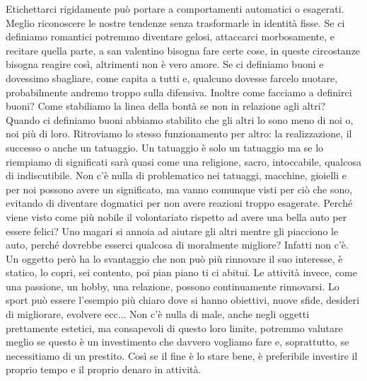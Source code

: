\documentclass[12pt]{book} %
\begin{document}
Etichettarci rigidamente può portare a comportamenti automatici o esagerati. Meglio riconoscere le nostre tendenze senza trasformarle in identità fisse.
Se ci definiamo romantici potremmo diventare gelosi, attaccarci morbosamente, e recitare quella parte, a san valentino bisogna fare certe cose, in queste circostanze bisogna reagire così, altrimenti non è vero amore. Se ci definiamo buoni e dovessimo sbagliare, come capita a tutti e, qualcuno dovesse farcelo nuotare, probabilmente andremo troppo sulla difensiva. 
Inoltre come facciamo a definirci buoni? Come stabiliamo la linea della bontà se non in relazione agli altri? Quando ci definiamo buoni abbiamo stabilito che gli altri lo sono meno di noi o, noi più di loro. Ritroviamo lo stesso funzionamento per altro: la realizzazione, il successo o anche un tatuaggio. Un tatuaggio è solo un tatuaggio ma se lo riempiamo di significati sarà quasi come una religione, sacro, intoccabile, qualcosa di indiscutibile. Non c'è nulla di problematico nei tatuaggi, macchine, gioielli e per noi possono avere un significato, ma vanno comunque visti per ciò che sono, evitando di diventare dogmatici per non avere reazioni troppo esagerate.
Perché viene visto come più nobile il volontariato rispetto ad avere una bella auto per essere felici? Uno magari si annoia ad aiutare gli altri mentre gli piacciono le auto, perché dovrebbe esserci qualcosa di moralmente migliore? Infatti non c'è.
Un oggetto però ha lo svantaggio che non può più rinnovare il suo interesse, è statico, lo copri, sei contento, poi pian piano ti ci abitui. Le attività invece, come una passione, un hobby, una relazione, possono continuamente rinnovarsi. Lo sport può essere l'esempio più chiaro dove si hanno obiettivi, nuove sfide, desideri di migliorare, evolvere ecc... Non c'è nulla di male, anche negli oggetti prettamente estetici, ma consapevoli di questo loro limite, potremmo valutare meglio se questo è un investimento che davvero vogliamo fare e, soprattutto, se necessitiamo di un prestito. Così se il fine è lo stare bene, è preferibile investire il proprio tempo e il proprio denaro in attività.
\end{document}
